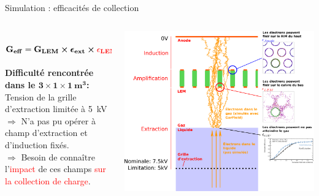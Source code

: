     \begin{frame}{Simulation : efficacités de collection}
    	\begin{scriptsize}
    		\begin{columns}
    			\hspace{-1.5cm}
	    		\begin{column}{0.3\textwidth}
	    			\vspace{-2.5cm}
	    			\hbox{
	    				$\mathbf{G_{eff}=G_{LEM}\boldsymbol{\times}\boldsymbol{\epsilon}_{ext} \boldsymbol{\times}\textcolor{red}{\epsilon_{LEM}}\boldsymbol{\times} \textcolor{blue}{\epsilon_{anode}}}$
	    			}\\
	    			\vspace{1.3cm}
	    			\textbf{Difficulté rencontrée dans le $\mathbf{3 \times 1 \times \SI[detect-weight]{1}{\meter\cubed}}$:} Tension de la grille d'extraction limitée à \SI{5}{\kilo\volt}\\
	    			\vspace{0.3cm}
	    			$\Rightarrow$ N'a pas pu opérer à champ d'extraction et d'induction fixés.\\
	    			$\Rightarrow$ Besoin de connaître l'\textcolor{red}{impact} de ces champs \textcolor{red}{sur la collection de charge}.\\
	    			\vfill
	    		\end{column}\hfill\hspace{-3.2cm}
	    		\begin{column}{0.65\textwidth}
	    			\includegraphics[width=1.18\textwidth]{./pictures/coll_proba_2.png}\\

\end{column}
\end{columns}
\end{scriptsize}
\end{frame}

